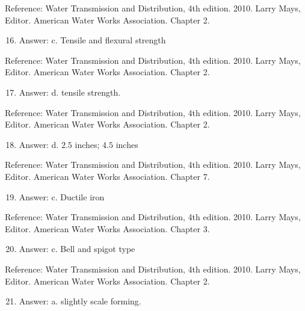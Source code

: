 \documentclass[10pt]{article}
\begin{document}
Reference: Water Transmission and Distribution, 4th edition. 2010. Larry Mays, Editor. American Water Works Association. Chapter 2.

\begin{enumerate}
  \setcounter{enumi}{15}
  \item Answer: c. Tensile and flexural strength
\end{enumerate}

Reference: Water Transmission and Distribution, 4th edition. 2010. Larry Mays, Editor. American Water Works Association. Chapter 2.

\begin{enumerate}
  \setcounter{enumi}{16}
  \item Answer: d. tensile strength.
\end{enumerate}

Reference: Water Transmission and Distribution, 4th edition. 2010. Larry Mays, Editor. American Water Works Association. Chapter 2.

\begin{enumerate}
  \setcounter{enumi}{17}
  \item Answer: d. $2.5$ inches; $4.5$ inches
\end{enumerate}

Reference: Water Transmission and Distribution, 4th edition. 2010. Larry Mays, Editor. American Water Works Association. Chapter 7.

\begin{enumerate}
  \setcounter{enumi}{18}
  \item Answer: c. Ductile iron
\end{enumerate}

Reference: Water Transmission and Distribution, 4th edition. 2010. Larry Mays, Editor. American Water Works Association. Chapter 3.

\begin{enumerate}
  \setcounter{enumi}{19}
  \item Answer: c. Bell and spigot type
\end{enumerate}

Reference: Water Transmission and Distribution, 4th edition. 2010. Larry Mays, Editor. American Water Works Association. Chapter 2.

\begin{enumerate}
  \setcounter{enumi}{20}
  \item Answer: a. slightly scale forming.
\end{enumerate}
\end{document}
